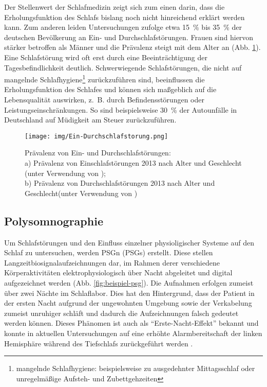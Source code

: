 Der Stellenwert der Schlafmedizin zeigt sich zum einen darin, dass die Erholungsfunktion des Schlafs bislang noch nicht hinreichend erklärt werden kann. Zum anderen leiden Untersuchungen zufolge etwa 15~\% bis 35~\% der deutschen Bevölkerung an Ein- und Durchschlafstörungen. Frauen sind hiervon stärker betroffen als Männer und die Prävalenz steigt mit dem Alter an (Abb. \ref{fig:ein-durchschlafstörung}). Eine Schlafstörung wird oft erst durch eine Beeinträchtigung der Tagesbefindlichkeit deutlich. Schwerwiegende Schlafstörungen, die nicht auf mangelnde Schlafhygiene\footnote{mangelnde Schlafhygiene: beispielsweise zu ausgedehnter Mittagsschlaf oder unregelmäßige Aufsteh- und Zubettgehzeiten} zurückzuführen sind, beeinflussen die Erholungsfunktion des Schlafes und können sich maßgeblich auf die Lebensqualität auswirken, z.~B. durch Befindensstörungen oder Leistungseinschränkungen. So sind beispielsweise 30~\% der Autounfälle in Deutschland auf Müdigkeit am Steuer zurückzuführen. \parencite{mayer_s3-leitlinie_2009, happe_schlafmedizin_2009, penzel_schlafstorungen_2005}

\begin{figure}[H]
	\centering
	\texttt{[image: img/Ein-Durchschlafstorung.png]}
	\caption[Prävalenz von Ein- und Durchschlafstörungen]{Prävalenz von Ein- und Durchschlafstörungen:\\a) Prävalenz von Einschlafstörungen 2013 nach Alter und Geschlecht (unter Verwendung von \parencite{schlack_haufigkeit_2013});\\b) Prävalenz von Durchschlafstörungen 2013 nach Alter und Geschlecht(unter Verwendung von  \parencite{schlack_haufigkeit_2013})}
	\label{fig:ein-durchschlafstörung}
\end{figure}

\subsection{Polysomnographie}\label{psg} 

Um Schlafstörungen und den Einfluss einzelner physioligischer Systeme auf den Schlaf zu untersuchen, werden \acl{PSG}n (\acs{PSG}s) erstellt. Diese stellen Langzeitbiosignalaufzeichnungen dar, im Rahmen derer verschiedene Körperaktivitäten elektrophysiologisch über Nacht abgeleitet und digital aufgezeichnet werden (Abb. \ref{fig:beispiel-psg}). Die Aufnahmen erfolgen zumeist über zwei Nächte im Schlaflabor. Dies hat den Hintergrund, dass der Patient in der ersten Nacht aufgrund der ungewohnten Umgebung sowie der Verkabelung zumeist unruhiger schläft und dadurch die Aufzeichnungen falsch gedeutet werden können. Dieses Phänomen ist auch als "`Erste-Nacht-Effekt"' bekannt und konnte in aktuellen Untersuchungen auf eine erhöhte Alarmbereitschaft der linken Hemisphäre während des Tiefschlafs zurückgeführt werden \parencite{tamaki_night_2016}. \\

